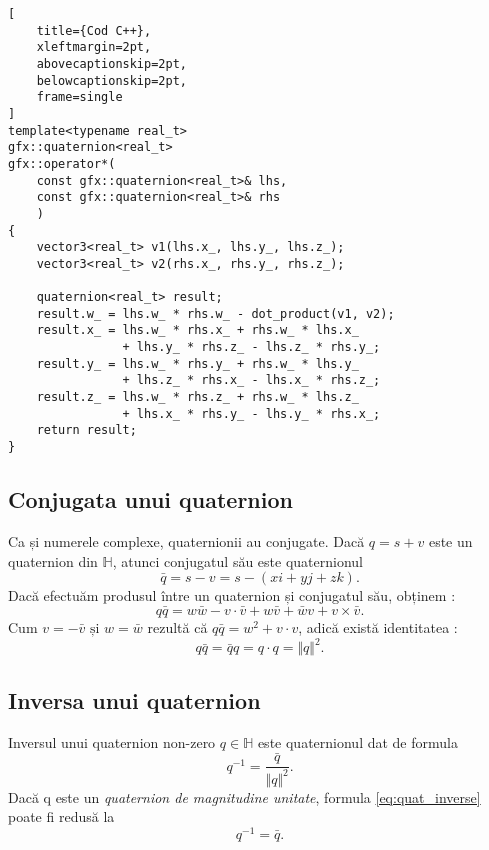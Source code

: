 \begin{lstlisting}[
    title={Cod C++}, 
    xleftmargin=2pt,
    abovecaptionskip=2pt,
    belowcaptionskip=2pt,
    frame=single
]
template<typename real_t>
gfx::quaternion<real_t>
gfx::operator*(
    const gfx::quaternion<real_t>& lhs, 
    const gfx::quaternion<real_t>& rhs
    )
{
    vector3<real_t> v1(lhs.x_, lhs.y_, lhs.z_);
    vector3<real_t> v2(rhs.x_, rhs.y_, rhs.z_);

    quaternion<real_t> result;
    result.w_ = lhs.w_ * rhs.w_ - dot_product(v1, v2);
    result.x_ = lhs.w_ * rhs.x_ + rhs.w_ * lhs.x_ 
                + lhs.y_ * rhs.z_ - lhs.z_ * rhs.y_;
    result.y_ = lhs.w_ * rhs.y_ + rhs.w_ * lhs.y_ 
                + lhs.z_ * rhs.x_ - lhs.x_ * rhs.z_;
    result.z_ = lhs.w_ * rhs.z_ + rhs.w_ * lhs.z_ 
                + lhs.x_ * rhs.y_ - lhs.y_ * rhs.x_;
    return result;
}
\end{lstlisting}

\subsection{Conjugata unui quaternion}
\label{ch1:quaternions:conjugate}
Ca și numerele complexe, quaternionii au conjugate.
Dacă $q = s + v$ este un quaternion din $\mathbb{H}$, atunci conjugatul său este
quaternionul
\begin{equation}
\bar{q} = s - v = s - (x\mathit{i} + y\mathit{j} + z\mathit{k}).
\end{equation}
Dacă efectuăm produsul între un quaternion și conjugatul său, obținem :
\[
q\bar{q} = w\bar{w} - v \cdot \bar{v} + w\bar{v} + \bar{w}v + v \times \bar{v}.
\]
Cum $v = -\bar{v} \text{ și } w = \bar{w}$ rezultă că $q\bar{q} = w^2 +
v\cdot v$, adică există identitatea : 
\begin{equation}
q\bar{q} = \bar{q}q = q \cdot q = \Vert q \Vert ^ 2.
\end{equation}

\subsection{Inversa unui quaternion}
\label{ch1:quaternions:inverse}
Inversul unui quaternion non-zero $q \in \mathbb{H}$ este quaternionul dat de 
formula
\begin{equation}
\label{eq:quat_inverse}
q^{-1} = \frac{\bar{q}}{\Vert q \Vert ^ 2}.
\end{equation}
Dacă q este un \textit{quaternion de magnitudine unitate}, formula
\eqref{eq:quat_inverse} poate fi redusă la
\begin{equation}
q^{-1} = \bar{q}.
\end{equation}

